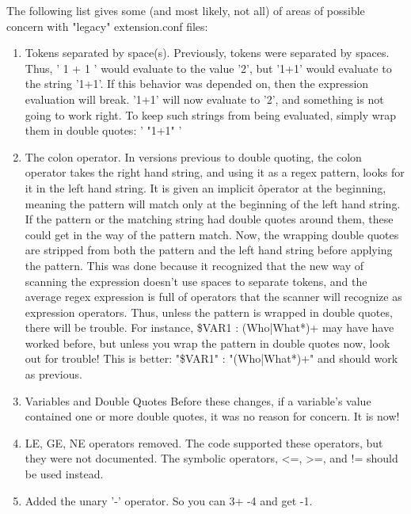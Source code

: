 The following list gives some (and most likely, not all) of areas
of possible concern with "legacy" extension.conf files:

\begin{enumerate}
\item Tokens separated by space(s).
   Previously, tokens were separated by spaces. Thus, ' 1 + 1 ' would evaluate
   to the value '2', but '1+1' would evaluate to the string '1+1'. If this
   behavior was depended on, then the expression evaluation will break. '1+1'
   will now evaluate to '2', and something is not going to work right.
   To keep such strings from being evaluated, simply wrap them in double 
   quotes: '  "1+1" '

\item The colon operator. In versions previous to double quoting, the
   colon operator takes the right hand string, and using it as a 
   regex pattern, looks for it in the left hand string. It is given
   an implicit \^ operator at the beginning, meaning the pattern 
   will match only at the beginning of the left hand string. 
   If the pattern or the matching string had double quotes around
   them, these could get in the way of the pattern match. Now,
   the wrapping double quotes are stripped from both the pattern 
   and the left hand string before applying the pattern. This
   was done because it recognized that the new way of
   scanning the expression doesn't use spaces to separate tokens,
   and the average regex expression is full of operators that 
   the scanner will recognize as expression operators. Thus, unless
   the pattern is wrapped in double quotes, there will be trouble.
   For instance,      \${VAR1} : (Who|What*)+
   may have have worked before, but unless you wrap the pattern
   in double quotes now, look out for trouble! This is better:
         "\${VAR1}" : "(Who|What*)+"
   and should work as previous.

\item Variables and Double Quotes
   Before these changes, if a variable's value contained one or more double
   quotes, it was no reason for concern. It is now!

\item LE, GE, NE operators removed. The code supported these operators,
   but they were not documented. The symbolic operators, <=, >=, and !=
   should be used instead.

\item  Added the unary '-' operator. So you can 3+ -4 and get -1.


\end{enumerate}
